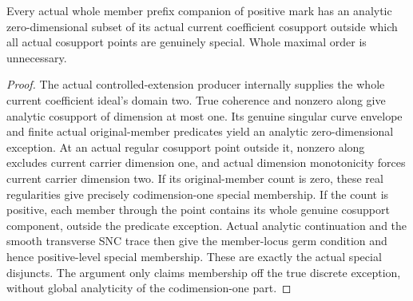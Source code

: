 \begin{lemma}
\label{hir:member-masked-positive-actual-special-exception}
\leanok
Every actual whole member prefix companion of positive mark has an analytic
zero-dimensional subset of its actual current coefficient cosupport outside
which all actual cosupport points are genuinely special. Whole maximal order
is unnecessary.
\end{lemma}
\begin{proof}
The actual controlled-extension producer internally supplies the whole
current coefficient ideal's domain two. True coherence and nonzero along
give analytic cosupport of dimension at most one. Its genuine singular
curve envelope and finite actual original-member predicates yield an analytic
zero-dimensional exception. At an actual regular cosupport point outside it,
nonzero along excludes current carrier dimension one, and actual dimension
monotonicity forces current carrier dimension two. If its original-member
count is zero, these real regularities give precisely codimension-one
special membership. If the count is positive, each member through the point
contains its whole genuine cosupport component, outside the predicate
exception. Actual analytic continuation and the smooth transverse SNC trace
then give the member-locus germ condition and hence positive-level special
membership. These are exactly the actual special disjuncts. The argument
only claims membership off the true discrete exception, without global
analyticity of the codimension-one part.
\end{proof}

